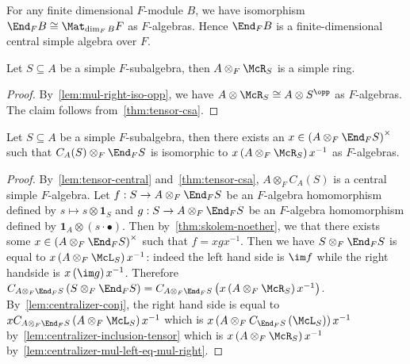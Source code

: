  \begin{remark}
   For any finite dimensional $F$-module $B$, we have isomorphism
   $\End_{F}B \cong \Mat_{\dim_{F}B}F$ as $F$-algebras. Hence $\End_{F} B$ is a
   finite-dimensional central simple algebra over $F$.
 \end{remark}

 \begin{lemma}\label{lem:tensor-mul-right-simple}
   Let $S\subseteq A$ be a simple $F$-subalgebra, then
   $A \otimes_{F} \McR_{S}$ is a simple ring.
   \leanok
 \end{lemma}

 \begin{proof}
   By~\cref{lem:mul-right-iso-opp}, we have
   $A\otimes \McR_{S}\cong A\otimes S^{\opp}$ as $F$-algebras. The claim follows
   from~\cref{thm:tensor-csa}.
 \end{proof}

 \begin{lemma}\label{lem:centralizer-tensor-end-eq-conj-tensor-mul-right}
   Let $S\subseteq A$ be a simple $F$-subalgebra, then there
   exists an $x\in \left(A\otimes_{F}\End_{F}S\right)^{\times}$ such that
   $C_{A}(S)\otimes_{F}\End_{F}S$ is isomorphic to
   $x\left(A\otimes_{F}\McR_{S}\right)x^{-1}$ as $F$-algebras.
   \leanok
 \end{lemma}

 \begin{proof}
   By~\cref{lem:tensor-central} and~\cref{thm:tensor-csa},
   $A \otimes_{F}C_{A}(S)$ is a central simple $F$-algebra. Let
   $f : S \to A\otimes_{F}\End_{F}S$ be an $F$-algebra homomorphism defined by
   $s \mapsto s \otimes \mathbf{1}_{S}$ and $g : S \to A \otimes_{F}\End_{F}S$
   be an $F$-algebra homomorphism defined by
   $\mathbf{1}_{A} \otimes \left(s\cdot\bullet\right)$. Then
   by~\cref{thm:skolem-noether}, we that there exists some
   $x\in \left(A\otimes_{F}\End_{F}S\right)^{\times}$ such that $f = xgx^{-1}$.
   Then we have $S\otimes_{F}\End_{F}S$ is equal to
   $x\left(A\otimes_{F}\McL_{S}\right)x^{-1}$: indeed the left hand side is
   $\im f$ while the right handside is $x\left(\im g\right)x^{-1}$. Therefore
   $C_{A\otimes_{F}\End_{F}S}\left(S\otimes_{F}\End_{F}S\right) = C_{A\otimes_{F}\End_{F}S}\left(x\left(A\otimes_{F}\McR_{S}\right)x^{-1}\right)$.
   By~\cref{lem:centralizer-conj}, the right hand side is equal to
   $xC_{A\otimes_{F}\End_{F}S}\left(A\otimes_{F}\McL_{S}\right)x^{-1}$ which is
   $x\left(A\otimes_{F}C_{\End_{F}S}\left(\McL_{S}\right)\right)x^{-1}$
   by~\cref{lem:centralizer-inclusion-tensor} which is
   $x\left(A\otimes_{F}\McR_{S}\right)x^{-1}$
   by~\cref{lem:centralizer-mul-left-eq-mul-right}.
 \end{proof}


